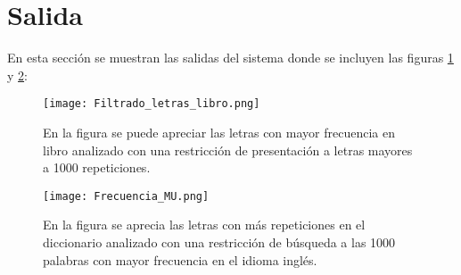 \documentclass{article}
\begin{document}
\section{Salida}
En esta sección se muestran las salidas del sistema donde se incluyen las figuras \ref{fig:letras} y \ref{fig:Letras_filtradas}:
\begin{figure}[ht]
    \centering
    \texttt{[image: Filtrado\_letras\_libro.png]}
    \caption{En la figura se puede apreciar las letras con mayor frecuencia en libro analizado con una restricción de presentación a letras mayores a 1000 repeticiones.}
    \label{fig:letras}
\end{figure}
\begin{figure}[ht]
    \centering
    \texttt{[image: Frecuencia\_MU.png]}
    \caption{En la figura se aprecia las letras con más repeticiones en el diccionario analizado con una restricción de búsqueda a las 1000 palabras con mayor frecuencia en el idioma inglés.}
    \label{fig:Letras_filtradas}
\end{figure}




\clearpage


\end{document}

